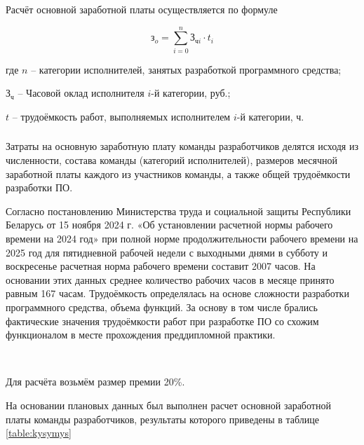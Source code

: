 Расчёт основной заработной платы осуществляется по формуле

\begin{equation}
	\label{eq:зарплата}
	\text{з}_o = \sum_{i=0}^{n} \text{З}_{\text{ч}i} \cdot t_i
\end{equation}


\begin{explanationx}
	\item[где]  $n$  -- категории исполнителей, занятых разработкой программного средства;
	\item $\text{З}_\text{ч}$ --  Часовой оклад исполнителя $i\text{-й}$ категории, руб.;
	\item $t$  -- трудоёмкость работ, выполняемых исполнителем $i\text{-й}$ категории, ч.
\end{explanationx}


\subsubsection{} Затраты на основную заработную плату команды разработчиков делятся исходя из численности, состава команды (категорий исполнителей), размеров месячной заработной платы каждого из участников команды, а также общей трудоёмкости разработки ПО. 

\def \hoursPerMonth {167}

Согласно постановлению Министерства труда и социальной защиты Республики Беларусь от 15 ноября 2024 г.  «Об установлении расчетной нормы рабочего времени на 2024 год» при полной норме продолжительности рабочего времени на 2025 год для пятидневной рабочей недели с выходными днями в субботу и воскресенье расчетная норма рабочего времени составит 2007 часов. На основании этих данных среднее количество рабочих часов в месяце принято равным \hoursPerMonth{} часам.
Трудоёмкость определялась на основе сложности разработки программного средства, объема функций. За основу в том числе брались фактические значения трудоёмкости работ при разработке ПО со схожим функционалом в месте прохождения преддипломной практики.

~\cite{nobody06}

Для расчёта возьмём размер премии 20\%.

На основании плановых данных был выполнен расчет основной заработной платы команды разработчиков, результаты которого приведены в таблице \ref{table:kysymys}


\def \devSalary {2100.00}
\def \amountOfHours {400}
\FPeval{\hourlySalary}{round(\devSalary / \hoursPerMonth, 2)}
\FPeval{\devCost}{round(\amountOfHours * \hourlySalary, 2)}


